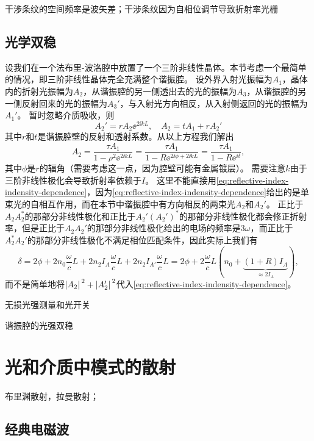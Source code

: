 干涉条纹的空间频率是波矢差；干涉条纹因为自相位调节导致折射率光栅

\subsection{光学双稳}

设我们在一个法布里-波洛腔中放置了一个三阶非线性晶体。本节考虑一个最简单的情况，即三阶非线性晶体完全充满整个谐振腔。
设外界入射光振幅为$A_1$，晶体内的折射光振幅为$A_2$，从谐振腔的另一侧透出去的光的振幅为$A_3$，从谐振腔的另一侧反射回来的光的振幅为$A_3'$，与入射光方向相反，从入射侧返回的光的振幅为$A_1'$。
暂时忽略介质吸收，则
\begin{equation}
    A_2' = r A_2 \ee^{2 \ii k L}, \quad A_2 = t A_1 + r A_2'
\end{equation}
其中$r$和$t$是谐振腔壁的反射和透射系数。从以上方程我们解出
\begin{equation}
    A_2 = \frac{\tau A_1}{1 - \rho^2 \ee^{2 \ii k L}} = \frac{\tau A_1}{1 - R \ee^{2 \ii \phi + 2 \ii k L}} = \frac{\tau A_1}{1 - R \ee^{\ii \delta}},
\end{equation}
其中$\phi$是$r$的辐角（需要考虑这一点，因为腔壁可能有金属镀层）。
需要注意$k$由于三阶非线性极化会导致折射率依赖于$I$。
这里不能直接用\eqref{eq:reflective-index-indensity-dependence}，因为\eqref{eq:reflective-index-indensity-dependence}给出的是单束光的自相互作用，而在本节中谐振腔中有方向相反的两束光$A_2$和$A_2'$。
正比于$A_2 A_2^*$的那部分非线性极化和正比于$A_2' (A_2')^*$的那部分非线性极化都会修正折射率，但是正比于$A_2 A_2'$的那部分非线性极化给出的电场的频率是$3 \omega$，而正比于$A_2^* A_2'$的那部分非线性极化不满足相位匹配条件，因此实际上我们有
\begin{equation}
    \delta = 2 \phi + 2 n_0 \frac{\omega}{c} L + 2 n_2 I_A \frac{\omega}{c} L + 2 n_2 I_{A'} \frac{\omega}{c} L = 2 \phi + 2 \frac{\omega}{c} L (n_0 + \underbrace{(1+R) I_A}_{\approx 2 I_A}),
\end{equation}
而不是简单地将$\abs*{A_2}^2 + \abs*{A_2'}^2$代入\eqref{eq:reflective-index-indensity-dependence}。


无损光强测量和光开关

谐振腔的光强双稳

\section{光和介质中模式的散射}

布里渊散射，拉曼散射；

\subsection{经典电磁波}

